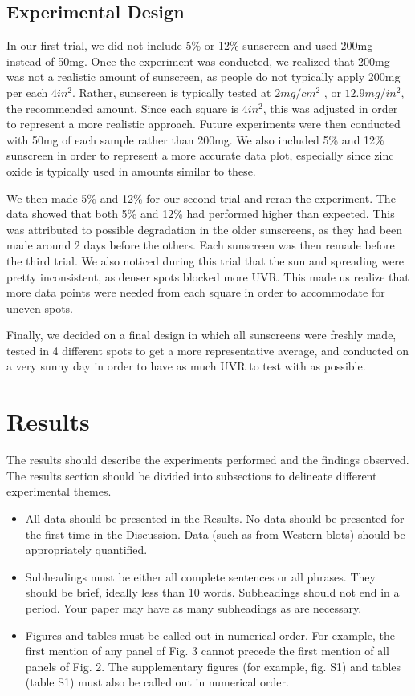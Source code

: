 \documentclass{article}
\begin{document}
\subsection{Experimental Design}
In our first trial, we did not include 5\% or 12\% sunscreen and used 200mg instead of 50mg. Once the experiment was conducted, we realized that 200mg was not a realistic amount of sunscreen, as people do not typically apply 200mg per each $4 in^2$. Rather, sunscreen is typically tested at $2 mg/cm^2$ \cite{fung_spfs_nodate}, or $12.9 mg/in^2$, the recommended amount. Since each square is $4in^2$, this was adjusted in order to represent a more realistic approach. Future experiments were then conducted with 50mg of each sample rather than 200mg. We also included 5\% and 12\% sunscreen in order to represent a more accurate data plot, especially since zinc oxide is typically used in amounts similar to these. 

We then made 5\% and 12\% for our second trial and reran the experiment. The data showed that both 5\% and 12\% had performed higher than expected. This was attributed to possible degradation in the older sunscreens, as they had been made around 2 days before the others. Each sunscreen was then remade before the third trial. We also noticed during this trial that the sun and spreading were pretty inconsistent, as denser spots blocked more UVR. This made us realize that more data points were needed from each square in order to accommodate for uneven spots. 

Finally, we decided on a final design in which all sunscreens were freshly made, tested in 4 different spots to get a more representative average, and conducted on a very sunny day in order to have as much UVR to test with as possible. 



\section{Results}
The results should describe the experiments performed and the findings observed. The results section should be divided into subsections to delineate different experimental themes. 
\begin{itemize}
    \item All data should be presented in the Results. No data should be presented for the first time in the Discussion. Data (such as from Western blots) should be appropriately quantified.
    \item Subheadings must be either all complete sentences or all phrases. They should be brief, ideally less than 10 words. Subheadings should not end in a period. Your paper may have as many subheadings as are necessary.
    \item Figures and tables must be called out in numerical order. For example, the first mention of any panel of Fig. 3 cannot precede the first mention of all panels of Fig. 2. The supplementary figures (for example, fig. S1) and tables (table S1) must also be called out in numerical order. 
\end{itemize}
\end{document}
